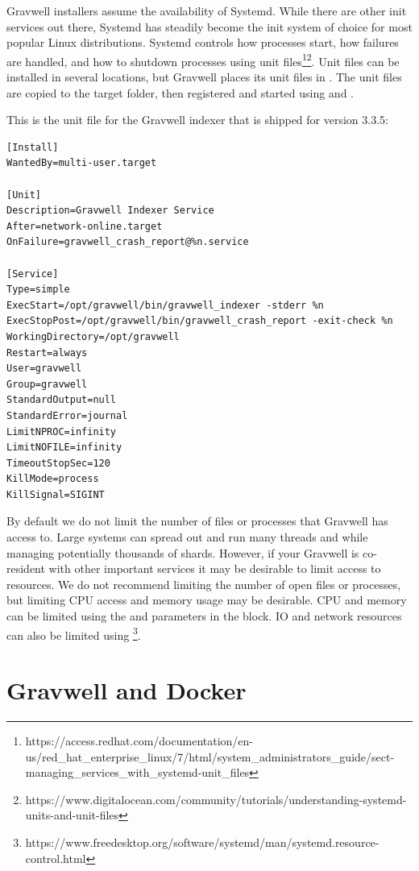 {Gravwell installers assume the availability of Systemd. While there are
other init services out there, Systemd has steadily become the
init system of choice for most popular Linux distributions. Systemd
controls how processes start, how failures are handled, and how to
shutdown processes using unit
files\footnote{https://access.redhat.com/documentation/en-us/red\_hat\_enterprise\_linux/7/html/system\_administrators\_guide/sect-managing\_services\_with\_systemd-unit\_files}\footnote{https://www.digitalocean.com/community/tutorials/understanding-systemd-units-and-unit-files}.
Unit files can be installed in several locations, but Gravwell places
its unit files in . The unit files are copied
to the target folder, then registered and started using  and .

This is the unit file for the Gravwell indexer that is shipped for
version 3.3.5:

\begin{Verbatim}[breaklines=true]
[Install]
WantedBy=multi-user.target

[Unit]
Description=Gravwell Indexer Service
After=network-online.target
OnFailure=gravwell_crash_report@%n.service

[Service]
Type=simple
ExecStart=/opt/gravwell/bin/gravwell_indexer -stderr %n
ExecStopPost=/opt/gravwell/bin/gravwell_crash_report -exit-check %n
WorkingDirectory=/opt/gravwell
Restart=always
User=gravwell
Group=gravwell
StandardOutput=null
StandardError=journal
LimitNPROC=infinity
LimitNOFILE=infinity
TimeoutStopSec=120
KillMode=process
KillSignal=SIGINT
\end{Verbatim}

By default we do not limit the number of files or processes that
Gravwell has access to. Large systems can spread out and run many
threads and while managing potentially thousands of shards. However, if
your Gravwell is co-resident with other important services it may be
desirable to limit access to resources. We do not recommend limiting
the number of open files or processes, but limiting CPU access and
memory usage may be desirable. CPU and memory can be limited using the
 and  parameters in the
\code{[Service]} block. IO and network resources can also be limited
using
\footnote{https://www.freedesktop.org/software/systemd/man/systemd.resource-control.html}.


\section{Gravwell and Docker}

}
